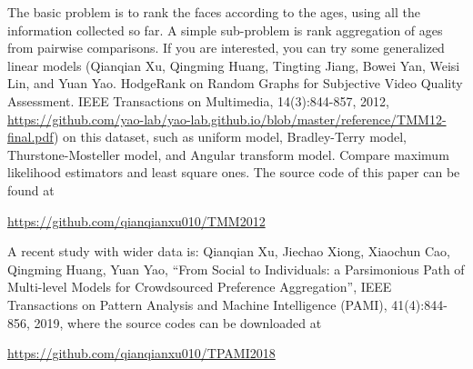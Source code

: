 \documentclass[11pt]{article}
\begin{document}
The basic problem is to rank the faces according to the ages, using all the information collected so far. A simple sub-problem is rank aggregation of ages from pairwise comparisons. If you are interested, you can try some generalized linear models (Qianqian Xu, Qingming Huang, Tingting Jiang, Bowei Yan, Weisi Lin, and Yuan Yao. HodgeRank on Random Graphs for Subjective Video Quality Assessment. IEEE Transactions on Multimedia, 14(3):844-857, 2012, \url{https://github.com/yao-lab/yao-lab.github.io/blob/master/reference/TMM12-final.pdf}) on this dataset, such as uniform model, Bradley-Terry model, Thurstone-Mosteller model, and Angular transform model. Compare maximum likelihood estimators and least square ones. The source code of this paper can be found at

\url{https://github.com/qianqianxu010/TMM2012} 

A recent study with wider data is: Qianqian Xu, Jiechao Xiong, Xiaochun Cao, Qingming Huang, Yuan Yao, “From Social to Individuals: a Parsimonious Path of Multi-level Models for Crowdsourced Preference Aggregation”, IEEE Transactions on Pattern Analysis and Machine Intelligence (PAMI), 41(4):844-856, 2019, where the source codes can be downloaded at

\url{https://github.com/qianqianxu010/TPAMI2018}





%
%
%
\end{document}
